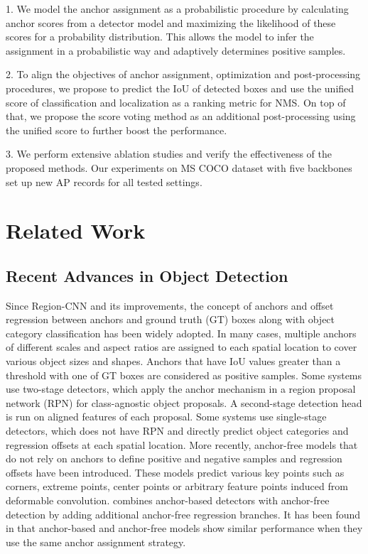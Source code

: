 \documentclass[runningheads]{llncs}
\begin{document}
1. We model the anchor assignment as a probabilistic procedure by calculating anchor scores from a detector model and maximizing the likelihood of these scores for a probability distribution. This allows the model to infer the assignment in a probabilistic way and adaptively determines positive samples.

2. To align the objectives of anchor assignment, optimization and post-processing procedures, we propose to predict the IoU of detected boxes and use the unified score of classification and localization as a ranking metric for NMS. On top of that, we propose the score voting method as an additional post-processing using the unified score to further boost the performance.

3. We perform extensive ablation studies and verify the effectiveness of the proposed methods. Our experiments on MS COCO dataset with five backbones set up new AP records for all tested settings.

\section{Related Work}
\subsection{Recent Advances in Object Detection}
Since Region-CNN\cite{rcnn} and its improvements\cite{fastrcnn, fasterrcnn}, the concept of anchors and offset regression between anchors and ground truth (GT) boxes along with object category classification has been widely adopted. In many cases, multiple anchors of different scales and aspect ratios are assigned to each spatial location to cover various object sizes and shapes. Anchors that have IoU values greater than a threshold with one of GT boxes are considered as positive samples. Some systems use two-stage detectors\cite{rcnn, fastrcnn, fasterrcnn, fpn}, which apply the anchor mechanism in a region proposal network (RPN) for class-agnostic object proposals. A second-stage detection head is run on aligned features\cite{fasterrcnn, maskrcnn} of each proposal. Some systems use single-stage detectors\cite{yolo, ssd, yolo2, refinedet, focal, m2det}, which does not have RPN and directly predict object categories and regression offsets at each spatial location. More recently, anchor-free models that do not rely on anchors to define positive and negative samples and regression offsets have been introduced. These models predict various key points such as corners\cite{cornernet}, extreme points\cite{extremepoints}, center points\cite{objectsaspoints, fcos} or arbitrary feature points\cite{reppoints} induced from deformable convolution\cite{deformableconv}. \cite{fsaf} combines anchor-based detectors with anchor-free detection by adding additional anchor-free regression branches. It has been found in \cite{atss} that anchor-based and anchor-free models show similar performance when they use the same anchor assignment strategy.
\end{document}
